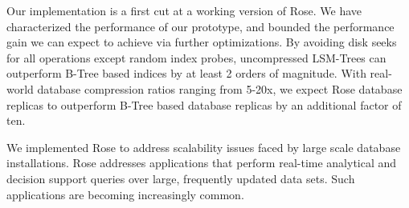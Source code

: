 \documentclass{vldb}
\newcommand{\rows}{Rose\xspace}
\begin{document}

Our implementation is a first cut at a working version of \rows.
We have characterized the performance of our prototype, and
bounded the performance gain we can expect to achieve via further
optimizations.  By avoiding disk seeks for all operations except
random index probes, uncompressed LSM-Trees can outperform
B-Tree based indices by at least 2 orders of magnitude.  With real-world
database compression ratios ranging from 5-20x, we expect \rows
database replicas to outperform B-Tree based database replicas by an
additional factor of ten.

We implemented \rows to address scalability issues faced by large
scale database installations.  \rows addresses
applications that perform real-time analytical and decision
support queries over large, frequently updated data sets.
Such applications are becoming increasingly common.


%
%
\balancecolumns %
\end{document}
